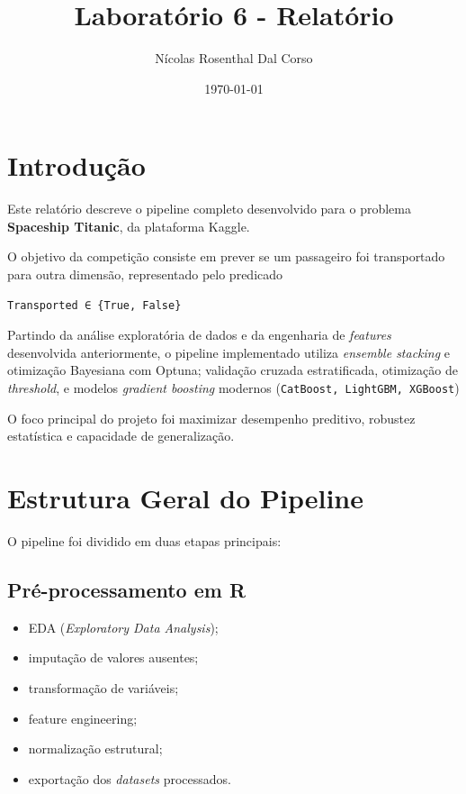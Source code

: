 \documentclass[12pt,a4paper]{article}
\author{Nícolas Rosenthal Dal Corso}
\date{\today}
\title{Laboratório 6 - Relatório}
\begin{document}
\maketitle
\setcounter{tocdepth}{3}
\tableofcontents

\section{Introdução}
\label{sec:orgfc9dc0a}

Este relatório descreve o pipeline completo desenvolvido para o problema
\textbf{Spaceship Titanic}, da plataforma Kaggle.

O objetivo da competição consiste em prever se um passageiro foi
transportado para outra dimensão, representado pelo predicado

\begin{verbatim}
Transported ∈ {True, False}
\end{verbatim}

Partindo da análise exploratória de dados e da engenharia de \emph{features} desenvolvida anteriormente, o pipeline implementado utiliza \emph{ensemble stacking} e otimização Bayesiana com Optuna; validação cruzada estratificada, otimização de \emph{threshold}, e modelos \emph{gradient boosting} modernos (\texttt{CatBoost, LightGBM, XGBoost})

O foco principal do projeto foi maximizar desempenho preditivo, robustez estatística e capacidade de generalização.
\section{Estrutura Geral do Pipeline}
\label{sec:orgdd54f66}
O pipeline foi dividido em duas etapas principais:
\subsection{Pré-processamento em R}
\label{sec:org29d83c5}
\begin{itemize}
\item EDA (\emph{Exploratory Data Analysis});
\item imputação de valores ausentes;
\item transformação de variáveis;
\item feature engineering;
\item normalização estrutural;
\item exportação dos \emph{datasets} processados.
\end{itemize}
\end{document}
